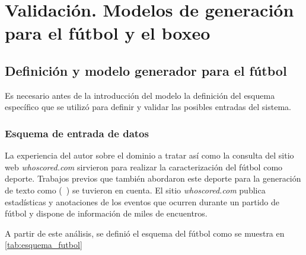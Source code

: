 \chapter{Validación. Modelos de generación para el fútbol y el boxeo}\label{chapter:validation}


\section{Definición y modelo generador para el fútbol}

    Es necesario antes de la introducción del modelo la definición del esquema específico que se utilizó para 
definir y validar las posibles entradas del sistema.

\subsection{Esquema de entrada de datos}

    La experiencia del autor sobre el dominio a tratar así como la consulta del sitio web \textit{whoscored.com} sirvieron para realizar la caracterización del 
fútbol como deporte. Trabajos previos que también abordaron este deporte para la generación de texto como (~\cite{theune2001data,aires2016automatic,van2017pass}) se tuvieron en cuenta. 
El sitio \textit{whoscored.com} publica estadísticas y anotaciones de los eventos que ocurren durante un partido de fútbol y dispone de información de miles de encuentros.

A partir de este análisis, se definió el esquema del fútbol como se muestra en \ref{tab:esquema_futbol}

